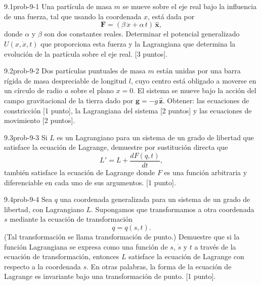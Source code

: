 \begin{problema}{9.1}{prob-9-1}
Una partícula de masa $m$ se mueve sobre el eje real bajo la influencia de una fuerza, tal que usando la coordenada $x$, está dada por
\[
\mathbf F = (\beta\,\ddot x + \alpha\,t)\,\hat{\mathbf x},
\]
donde $\alpha$ y $\beta$ son dos constantes reales. Determinar el potencial generalizado $U(x,\dot x,t)$ que proporciona esta fuerza y la Lagrangiana que determina la evolución de la partícula sobre el eje real. [3 puntos].
\end{problema}

\begin{problema}{9.2}{prob-9-2}
Dos partículas puntuales de masa $m$ están unidas por una barra rígida de masa despreciable de longitud $l$, cuyo centro está obligado a moverse en un círculo de radio $a$ sobre el plano $x=0$. El sistema se mueve bajo la acción del campo gravitacional de la tierra dado por $\mathbf g=-g\,\hat{\mathbf z}$. Obtener: las ecuaciones de constricción [1 punto], la Lagrangiana del sistema [2 puntos] y las ecuaciones de movimiento [2 puntos].
\end{problema}

\begin{problema}{9.3}{prob-9-3}
Si $L$ es un Lagrangiano para un sistema de un grado de libertad que satisface la ecuación de Lagrange, demuestre por sustitución directa que
\[
L' = L + \frac{dF(q,t)}{dt},
\]
también satisface la ecuación de Lagrange donde $F$ es una función arbitraria y diferenciable en cada uno de sus argumentos. [1 punto].
\end{problema}

\begin{problema}{9.4}{prob-9-4}
Sea $q$ una coordenada generalizada para un sistema de un grado de libertad, con Lagrangiano $L$. Supongamos que transformamos a otra coordenada $s$ mediante la ecuación de transformación
\[
q = q(s,t).
\]
(Tal transformación se llama transformación de punto.) Demuestre que si la función Lagrangiana se expresa como una función de $s$, $\dot s$ y $t$ a través de la ecuación de transformación, entonces $L$ satisface la ecuación de Lagrange con respecto a la coordenada $s$. En otras palabras, la forma de la ecuación de Lagrange es invariante bajo una transformación de punto. [1 punto].
\end{problema}




